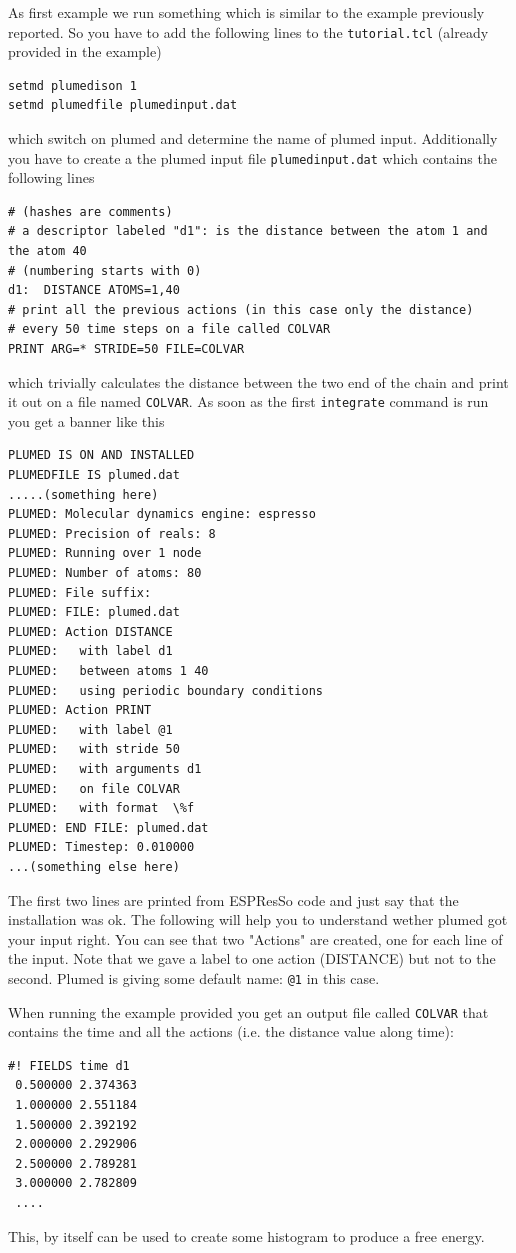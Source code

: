 \documentclass[10pt,fleqn,a4paper]{report}
\begin{document}
As first example we run something which is similar to the example previously reported.
So you have to add the following lines to the \texttt{tutorial.tcl} (already provided in the example)
\begin{verbatim}
setmd plumedison 1
setmd plumedfile plumedinput.dat
\end{verbatim}
which switch on plumed and determine the name of plumed input.
Additionally you have to
create a the plumed input file \texttt{plumedinput.dat} which contains the following lines
\begin{verbatim}
# (hashes are comments)
# a descriptor labeled "d1": is the distance between the atom 1 and the atom 40
# (numbering starts with 0)
d1:  DISTANCE ATOMS=1,40
# print all the previous actions (in this case only the distance)
# every 50 time steps on a file called COLVAR
PRINT ARG=* STRIDE=50 FILE=COLVAR
\end{verbatim}
which trivially calculates the distance between the two end of the chain and print it out on a file named \texttt{COLVAR}.
As soon as the first \texttt{integrate} command is run you get a banner like this
\begin{verbatim}
PLUMED IS ON AND INSTALLED
PLUMEDFILE IS plumed.dat
.....(something here)
PLUMED: Molecular dynamics engine: espresso
PLUMED: Precision of reals: 8
PLUMED: Running over 1 node
PLUMED: Number of atoms: 80
PLUMED: File suffix:
PLUMED: FILE: plumed.dat
PLUMED: Action DISTANCE
PLUMED:   with label d1
PLUMED:   between atoms 1 40
PLUMED:   using periodic boundary conditions
PLUMED: Action PRINT
PLUMED:   with label @1
PLUMED:   with stride 50
PLUMED:   with arguments d1
PLUMED:   on file COLVAR
PLUMED:   with format  \%f
PLUMED: END FILE: plumed.dat
PLUMED: Timestep: 0.010000
...(something else here)
\end{verbatim}
The first two lines are printed from ESPResSo code and just say that the installation was ok. 
The following will help you to understand wether plumed got your input right.
You can see that two "Actions" are created, one for each line of the input. Note that we gave a label to one action (DISTANCE) but not to the second. Plumed is giving some default name:  \texttt{@1} in this case.

When running the example provided you get an output file called \texttt{COLVAR} that contains the time and all the actions (i.e. the distance value along time):
\begin{verbatim}
#! FIELDS time d1
 0.500000 2.374363
 1.000000 2.551184
 1.500000 2.392192
 2.000000 2.292906
 2.500000 2.789281
 3.000000 2.782809
 ....
\end{verbatim}
This, by itself can be used to create some histogram to produce a free energy.
\end{document}
